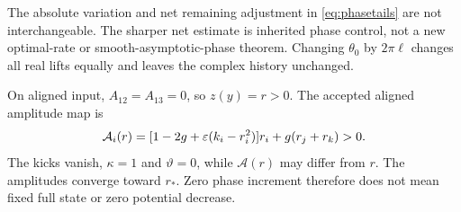 The absolute variation and net remaining adjustment in \eqref{eq:phasetails} are not interchangeable. The sharper net estimate is inherited phase control, not a new optimal-rate or smooth-asymptotic-phase theorem. Changing \(\theta_0\) by \(2\pi\ell\) changes all real lifts equally and leaves the complex history unchanged.

On aligned input, \(A_{12}=A_{13}=0\), so \(z(y)=r>0\). The accepted aligned amplitude map is
\[
\mathcal A_i(r)=[1-2g+\varepsilon(k_i-r_i^2)]r_i+g(r_j+r_k)>0.
\]
The kicks vanish, \(\kappa=1\) and \(\vartheta=0\), while \(\mathcal A(r)\) may differ from \(r\). The amplitudes converge toward \(r_*\). Zero phase increment therefore does not mean fixed full state or zero potential decrease.
